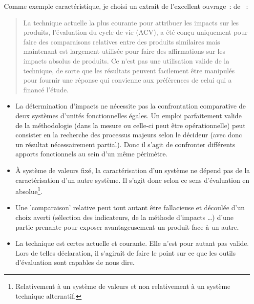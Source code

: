   Comme exemple caractéristique, je choisi un extrait de l'excellent ouvrage~:  de \citeauthor{cullen_sustainable_2011}~:
  \blockcquote[traduction]{cullen_sustainable_2011}{
  La technique actuelle la plus courante pour attribuer les impacts sur les produits, l'évaluation du cycle de vie (ACV), a été conçu uniquement pour faire des comparaisons relatives entre des produits similaires mais maintenant est largement utilisée pour faire des affirmations sur les impacts absolus de produits.
  Ce n'est pas une utilisation valide de la technique, de sorte que les résultats peuvent facilement être manipulés pour fournir une réponse qui convienne aux préférences de celui qui a financé l'étude.
  }
  \begin{itemize}
  \item La détermination d'impacts ne nécessite pas la confrontation comparative de deux systèmes d'unités fonctionnelles égales.
  Un emploi parfaitement valide de la méthodologie (dans la mesure ou celle-ci peut être opérationnelle) peut consister en la recherche des processus majeurs selon le décideur (avec donc un résultat nécessairement partial).
  Donc il s'agit de confronter différents apports fonctionnels au sein d'un même périmètre.
  \item À système de valeurs fixé, la caractérisation d'un système ne dépend pas de la caractérisation d'un autre système.
  Il s'agit donc selon ce sens d'évaluation en absolue\footnote{Relativement à un système de valeurs et non relativement à un système technique alternatif.}.
  \item Une 'comparaison' relative peut tout autant être fallacieuse et découlée d'un choix averti (sélection des indicateurs, de la méthode d'impacts \ldots) d'une partie prenante pour exposer avantageusement un produit face à un autre.
  \item La technique est certes actuelle et courante.
  Elle n'est pour autant pas valide.
  Lors de telles déclaration, il s'agirait de faire le point sur ce que les outils d'évaluation sont capables de nous dire.
  \end{itemize}
  
